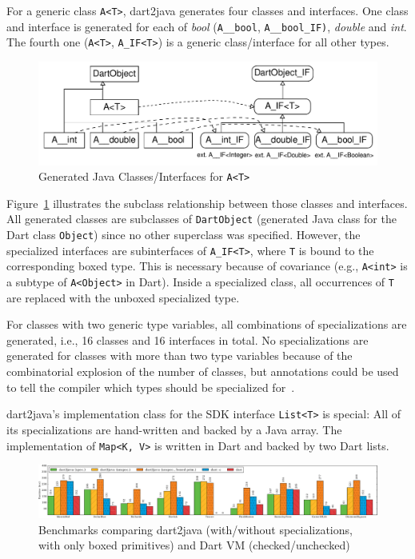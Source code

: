 \documentclass[sigplan,9pt]{acmart}
\begin{document}
For a generic class \texttt{A<T>}, dart2java generates four classes and interfaces. One class and interface is generated for each of \emph{bool} (\texttt{A\_\_bool}, \texttt{A\_\_bool\_IF)}, \emph{double} and \emph{int}. The fourth one (\texttt{A<T>},  \texttt{A\_IF<T>}) is a generic class/interface for all other types.

\begin{figure}[!htp]
	\includegraphics[width=\columnwidth]{generic_spec_classes.pdf}
    \vspace{-10pt}
    \caption{Generated Java Classes/Interfaces for \texttt{A<T>}}
    \label{fig:generic_spec_classes}
\end{figure}

Figure~\ref{fig:generic_spec_classes} illustrates the subclass relationship between those classes and interfaces. All generated classes are subclasses of \texttt{DartObject} (generated Java class for the Dart class \texttt{Object}) since no other superclass was specified. However, the specialized interfaces are subinterfaces of \texttt{A\_IF<T>}, where \texttt{T} is bound to the corresponding boxed type. This is necessary because of covariance (e.g., \texttt{A<int>} is a subtype of \texttt{A<Object>} in Dart). Inside a specialized class, all occurrences of \texttt{T} are replaced with the unboxed specialized type.

For classes with two generic type variables, all combinations of specializations are generated, i.e., 16 classes and 16 interfaces in total. No specializations are generated for classes with more than two type variables because of the combinatorial explosion of the number of classes, but annotations could be used to tell the compiler which types should be specialized for~\cite{Dragos:2009:CGT:1565824.1565830}.

dart2java's implementation class for the SDK interface \texttt{List<T>} is special: All of its specializations are hand-written and backed by a Java array. The implementation of \texttt{Map<K, V>} is written in Dart and backed by two Dart lists.

\begin{figure}[!t]
\includegraphics[width=\textwidth]{benchmark_plot.pdf}
\vspace{-10pt}
\caption{Benchmarks comparing dart2java (with/without specializations, with only boxed primitives) and Dart VM (checked/unchecked)}
\label{fig:benchmarks}
\end{figure}
\end{document}
